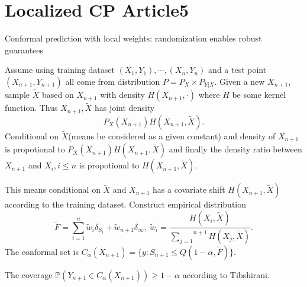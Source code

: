 \documentclass[12pt, a4paper, oneside]{article}
\begin{document}
\section{Localized CP Article5}
    Conformal prediction with local weights: randomization enables robust guarantees\cite{hore2023conformal}


    Assume using training dataset $(X_1,Y_1),\cdots,(X_n,Y_n)$ and a test point $(X_{n+1},Y_{n+1})$ all come from distribution $P=P_X\times P_{Y|X}$. Given a new $X_{n+1}$, sample $\tilde{X}$ based on $X_{n+1}$ with density $H(X_{n+1},\cdot)$ where $H$ be some kernel function. Thus $X_{n+1},\tilde{X}$ has joint density
    \begin{equation*}
        P_X(X_{n+1})H(X_{n+1},\tilde{X}).
    \end{equation*}
    Conditional on $\tilde{X}$(means be considered as a given constant) and density of $X_{n+1}$ is propotional to $P_X(X_{n+1})H(X_{n+1},\tilde{X})$ and finally the density ratio between $X_{n+1}$ and $X_{i},i\leq n$ is propotional to $H(X_{n+1},\tilde{X})$.


    This means conditional on $\tilde{X}$ and $X_{n+1}$ has a covariate shift $H(X_{n+1},\tilde{X})$ according to the training dataset. Construct empirical distribution
    \begin{equation*}
        \tilde{F}=\overset{n}{\underset{i=1}\sum}\tilde{w}_i\delta_{S_i}+\tilde{w}_{n+1}\delta_{\infty},\ \tilde{w}_i=\dfrac{H(X_i,\tilde{X})}{\overset{n+1}{\underset{j=1}\sum}H(X_j,\tilde{X})}.
    \end{equation*}
    The conformal set is $C_\alpha(X_{n+1})=\{y:S_{n+1}\leq Q(1-\alpha,\tilde{F})\}$.


    The coverage $\mathbb{P}(Y_{n+1}\in C_\alpha(X_{n+1}))\geq 1-\alpha$ according to Tibshirani\cite{tibshirani2019conformal}.
\newpage


\end{document}
